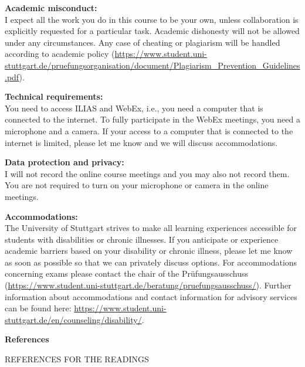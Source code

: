 \documentclass[12pt,fleqn,a4]{extarticle}
\newcommand{\6}{\mbox{$[\hspace*{-.6mm}[$}}
\newcommand{\9}{\mbox{$]\hspace*{-.6mm}]$}}
\begin{document}
\bigskip

{\bf Academic misconduct:}
\\
I expect all the work you do in this course to be your own, unless
collaboration is explicitly requested for a particular task. Academic dishonesty will not be
allowed under any circumstances. Any case of cheating or plagiarism
will be handled according to academic policy (\url{https://www.student.uni-stuttgart.de/pruefungsorganisation/document/Plagiarism_Prevention_Guidelines.pdf}).

\medskip

{\bf Technical requirements:}
\\
You need to access ILIAS and WebEx, i.e., you need a computer that is connected to the internet. To fully participate in the WebEx meetings, you need a microphone and a camera. If your access to a computer that is connected to the internet is limited, please let me know and we will discuss accommodations.

\medskip
{\bf Data protection and privacy:}
\\
I will not record the online course meetings and you may also not record them. You are not required to turn on your microphone or camera in the online meetings. 

\medskip

{\bf Accommodations:}
\\
The University of Stuttgart strives to make all learning experiences accessible for students with disabilities or chronic illnesses. If you anticipate or experience academic barriers based on your disability or chronic illness, please let me know as soon as possible so that we can privately discuss options. For accommodations concerning exams please contact the chair of the Pr\"ufungsausschuss (\url{https://www.student.uni-stuttgart.de/beratung/pruefungsausschuss/}). Further information about accommodations and contact information for advisory services can be found here: \url{https://www.student.uni-stuttgart.de/en/counseling/disability/}.

\bigskip

{\bf References}

REFERENCES FOR THE READINGS



\end{document}
